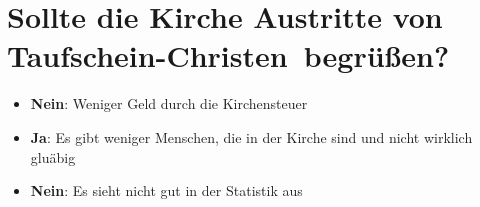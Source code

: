 \documentclass[../Religion.tex]{subfiles}
\begin{document}
	\section{Sollte die Kirche Austritte von \dq Taufschein-Christen\dq\ begrüßen?}
	\begin{itemize}
		\item \textbf{Nein}: Weniger Geld durch die Kirchensteuer
		\item \textbf{Ja}: Es gibt weniger Menschen, die in der Kirche sind und nicht wirklich gluäbig
		\item \textbf{Nein}: Es sieht nicht gut in der Statistik aus
	\end{itemize}
\end{document}
